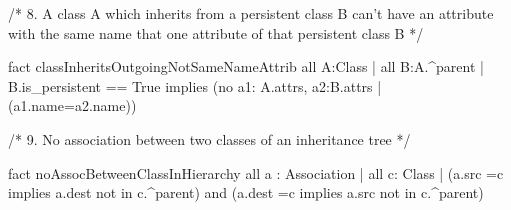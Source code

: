 /* 8. A class A which inherits from a persistent class B can't have an attribute with the same name 
that one attribute of that persistent class B */


fact classInheritsOutgoingNotSameNameAttrib
{
	all A:Class | all B:A.^parent | B.is_persistent == True implies (no a1: A.attrs, a2:B.attrs | 
(a1.name=a2.name))
}

/* 9. No association between two classes of an inheritance tree */

fact noAssocBetweenClassInHierarchy
{
	all a : Association | all c: Class | (a.src =c implies a.dest not in c.^parent) and (a.dest =c implies a.src not in c.^parent)
}